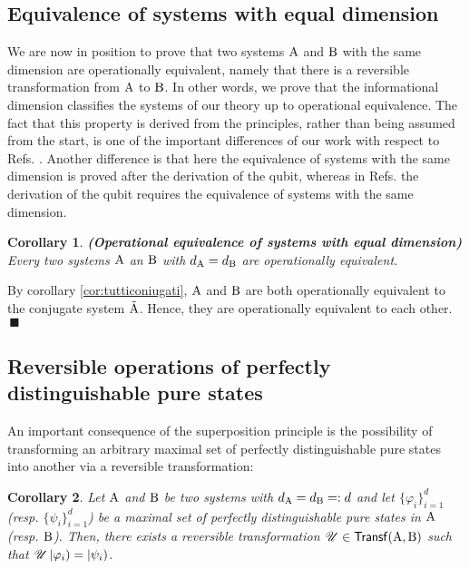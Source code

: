 \documentclass[12pt,aps,pra,showpacs,groupedaddress]{revtex4-1}
\newtheorem{corollary}{Corollary} \newtheorem{theorem}{Theorem}
\def\Proof{\medskip\par\noindent{\bf Proof. }}
\def\qed{$\,\blacksquare$\par}
\def\rB{{\rm B}}
\def\Trnset{{\mathsf{Transf}}}
\def\K#1{\left|#1\right)}  \def\B#1{\left(#1\right|}
\begin{document}
\subsection{Equivalence of systems with equal
  dimension}\label{subsec:equivalence}
We are now in position to prove that two systems ${\rm A}$ and $\rB$ with
the same dimension are operationally equivalent, namely that there is
a reversible transformation from ${\rm A}$ to $\rB$.  In other words, we
prove that the informational dimension classifies the systems of our theory up to
operational equivalence.  The fact that this property is derived from
the principles, rather than being assumed from the start, is one of
the important differences of our work with respect to Refs.
\cite{Har01,DakBru09,Mas10}. Another difference is that here the equivalence of systems with the same dimension is proved after the derivation of the qubit, whereas in Refs.  \cite{Har01,DakBru09,Mas10} the derivation of the qubit requires the equivalence of  systems with the same dimension.

\begin{corollary}{\bf (Operational equivalence of systems with equal dimension)}
Every two systems ${\rm A}$ an $\rB$ with $d_\rA = d_\rB$ are operationally equivalent.  \label{cor:equidim}
\end{corollary}

\Proof  By corollary \ref{cor:tutticoniugati}, ${\rm A}$ and $\rB$ are both operationally equivalent to the conjugate system $\tilde {{\rm A}}$. Hence, they are operationally equivalent to each other.  \qed

\subsection{Reversible operations of  perfectly distinguishable pure  states}

An important consequence of the superposition principle is the possibility of transforming an arbitrary maximal set of perfectly distinguishable pure states into another via a reversible transformation:  
\begin{corollary}\label{cor:reversibleclassicaloperations}
Let ${\rm A}$ and $\rB$ be two systems with $d_\rA = d_\rB=:d$ and let $\{\varphi_i\}_{i=1}^d$  (resp.  $\{\psi_i\}_{i=1}^d$) be a maximal set of perfectly distinguishable pure states in ${\rm A}$ (resp. $\rB$).   Then, there exists a reversible transformation $\tU \in \Trnset (\rA, \rB)$ such that $\tU \K{\varphi_i}  =\K{ \psi_i}$.
\end{corollary}
\end{document}
